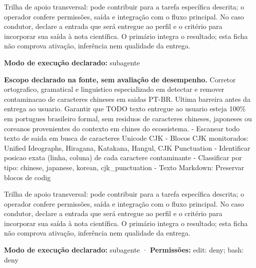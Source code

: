 \begin{funcao}
Trilha de apoio transversal: pode contribuir para a tarefa específica descrita; o operador confere permissões, saída e integração com o fluxo principal. No caso condutor, declare a entrada que será entregue ao perfil e o critério para incorporar sua saída à nota científica. O primário integra o resultado; esta ficha não comprova ativação, inferência nem qualidade da entrega.
\end{funcao}

\begin{arquitetura}
\textbf{Modo de execução declarado:} subagente
\end{arquitetura}


\begin{descricao}
\textbf{Escopo declarado na fonte, sem avaliação de desempenho.}
Corretor ortografico, gramatical e linguistico especializado em detectar e remover contaminacao de caracteres chineses em saidas PT-BR. Ultima barreira antes da entrega ao usuario. Garantir que TODO texto entregue ao usuario esteja 100\% em portugues brasileiro formal, sem residuos de caracteres chineses, japoneses ou coreanos provenientes do contexto em chines do ecossistema. - Escanear todo texto de saida em busca de caracteres Unicode CJK - Blocos CJK monitorados: Unified Ideographs, Hiragana, Katakana, Hangul, CJK Punctuation - Identificar posicao exata (linha, coluna) de cada caractere contaminante - Classificar por tipo: chinese, japanese, korean, cjk\_punctuation - Texto Markdown: Preservar blocos de codig
\end{descricao}

\begin{funcao}
Trilha de apoio transversal: pode contribuir para a tarefa específica descrita; o operador confere permissões, saída e integração com o fluxo principal. No caso condutor, declare a entrada que será entregue ao perfil e o critério para incorporar sua saída à nota científica. O primário integra o resultado; esta ficha não comprova ativação, inferência nem qualidade da entrega.
\end{funcao}

\begin{arquitetura}
\textbf{Modo de execução declarado:} subagente · \textbf{Permissões:} edit: deny; bash: deny
\end{arquitetura}

